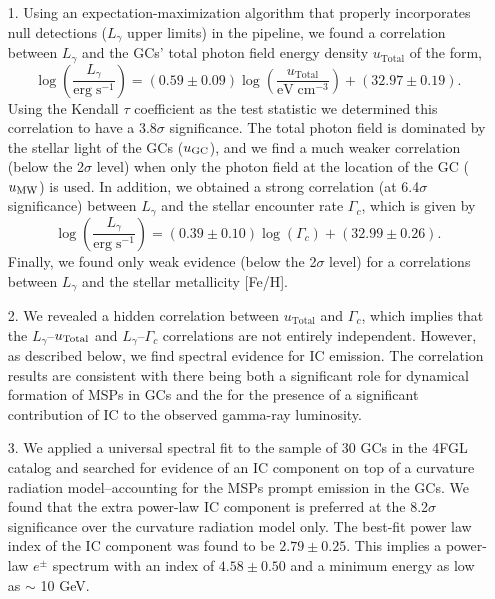 \documentclass[doublespace,nopageskip]{VTthesis} %
\begin{document}
\begin{itemize}
    \item[1.] Using an expectation-maximization algorithm that properly incorporates null detections ($L_\gamma$ upper limits) in the pipeline, we found a correlation between $L_\gamma$ and the GCs' total photon field energy density $u_\mathrm{Total}$ of the form, \begin{equation}
    \log\left(\frac{L_\gamma}{\mathrm{erg}\;\mathrm{s}^{-1}}\right) = (0.59 \pm 0.09)\log\left(\frac{u_\mathrm{Total}}{\mathrm{eV}\;\mathrm{cm}^{-3}}\right) + (32.97 \pm 0.19).
    \end{equation}
    Using the Kendall $\tau$ coefficient as the test statistic we determined this correlation to have a $3.8\sigma$ significance. The total photon field is dominated by the stellar light of the GCs  ($u_{\rm GC}$), and we find a much weaker correlation (below the 2$\sigma$ level) when only the photon field at the location of the GC ($u_{\rm MW}$) is used. In addition, we obtained a strong correlation (at 6.4$\sigma$ significance) between $L_\gamma$ and the stellar encounter rate $\Gamma_c$, which is given by 
    \begin{equation}
    \log\left(\frac{L_\gamma}{\mathrm{erg}\;\mathrm{s}^{-1}}\right) = (0.39 \pm 0.10)\log\left(\Gamma_c\right) + (32.99 \pm 0.26).
    \end{equation}
    Finally, we found only weak evidence (below the 2$\sigma$ level) for a correlations between $L_\gamma$ and the stellar metallicity [Fe/H].
    \item[2.] We revealed a hidden correlation between $u_\mathrm{Total}$ and $\Gamma_c$, which implies that the $L_\gamma$--$u_{\rm Total}$ and $L_\gamma$--$\Gamma_c$ correlations are not entirely independent. However, as described below, we find spectral evidence for IC emission. The correlation results are consistent with there being both a significant role for dynamical formation of MSPs in GCs and the for the presence of a significant contribution of IC to the observed gamma-ray luminosity.
    \item[3.] We applied a universal spectral fit to the sample of 30 GCs in the 4FGL catalog and searched for evidence of an IC component on top of a curvature radiation model--accounting for the MSPs prompt emission in the GCs. We found that the extra power-law IC component is preferred at the 8.2$\sigma$ significance over the curvature radiation model only. The best-fit power law index of the IC component was found to be $2.79 \pm 0.25$. This implies a power-law $e^\pm$ spectrum with an index of $4.58 \pm 0.50$ and a minimum energy as low as $\sim$ 10 GeV. 

\end{itemize}
\end{document}

